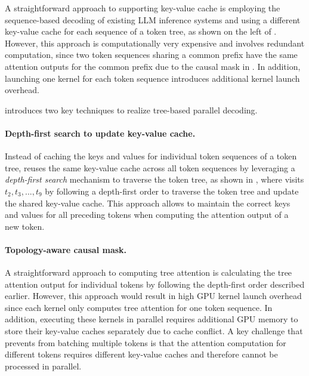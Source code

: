 A straightforward approach to supporting key-value cache is employing the sequence-based decoding of existing LLM inference systems and using a different key-value cache for each sequence of a token tree, as shown on the left of .
However, this approach is computationally very expensive and involves redundant computation, since two token sequences sharing a common prefix have the same attention outputs for the common prefix due to the causal mask in .
In addition, launching one kernel for each token sequence introduces additional kernel launch overhead.

\SpecInfer introduces two key techniques to realize tree-based parallel decoding.

\paragraph{Depth-first search to update key-value cache.} Instead of caching the keys and values for individual token sequences of a token tree, \SpecInfer reuses the same key-value cache across all token sequences by leveraging a {\em depth-first search} mechanism to traverse the token tree, as shown in , where \SpecInfer visits $t_2,t_3,...,t_9$ by following a depth-first order to traverse the token tree and update the shared key-value cache.
This approach allows \SpecInfer to maintain the correct keys and values for all preceding tokens when computing the attention output of a new token.

\paragraph{Topology-aware causal mask.} A straightforward approach to computing tree attention is calculating the tree attention output for individual tokens by following the depth-first order described earlier.
However, this approach would result in high GPU kernel launch overhead since each kernel only computes tree attention for one token sequence.
In addition, executing these kernels in parallel requires additional GPU memory to store their key-value caches separately due to cache conflict.
A key challenge that prevents \SpecInfer from batching multiple tokens is that the attention computation for different tokens requires different key-value caches and therefore cannot be processed in parallel.

